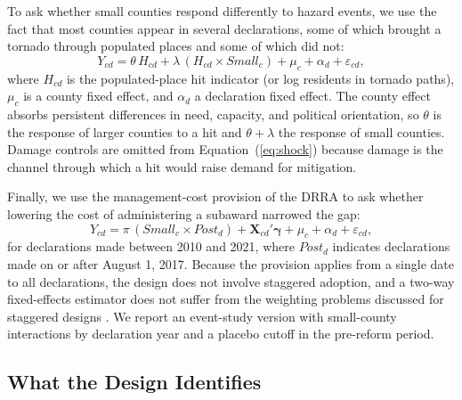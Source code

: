 To ask whether small counties respond differently to hazard events, we use the fact that most counties appear in several declarations, some of which brought a tornado through populated places and some of which did not:
\begin{equation}
Y_{cd} = \theta\, H_{cd} + \lambda\, (H_{cd} \times \mathit{Small}_c) + \mu_c + \alpha_d + \varepsilon_{cd},
\label{eq:shock}
\end{equation}
where $H_{cd}$ is the populated-place hit indicator (or log residents in tornado paths), $\mu_c$ is a county fixed effect, and $\alpha_d$ a declaration fixed effect. The county effect absorbs persistent differences in need, capacity, and political orientation, so $\theta$ is the response of larger counties to a hit and $\theta + \lambda$ the response of small counties. Damage controls are omitted from Equation~(\ref{eq:shock}) because damage is the channel through which a hit would raise demand for mitigation.

Finally, we use the management-cost provision of the DRRA to ask whether lowering the cost of administering a subaward narrowed the gap:
\begin{equation}
Y_{cd} = \pi\, (\mathit{Small}_c \times \mathit{Post}_d) + \mathbf{X}_{cd}'\boldsymbol{\gamma} + \mu_c + \alpha_d + \varepsilon_{cd},
\label{eq:drra}
\end{equation}
for declarations made between 2010 and 2021, where $\mathit{Post}_d$ indicates declarations made on or after August 1, 2017. Because the provision applies from a single date to all declarations, the design does not involve staggered adoption, and a two-way fixed-effects estimator does not suffer from the weighting problems discussed for staggered designs \parencite{roth2023trending}. We report an event-study version with small-county interactions by declaration year and a placebo cutoff in the pre-reform period.

\subsection{What the Design Identifies}

